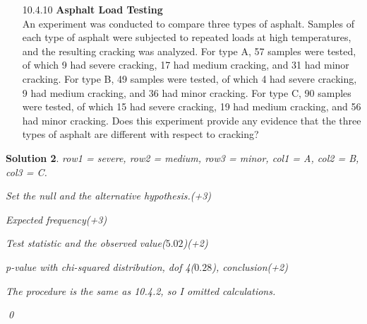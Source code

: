 \documentclass[a4paper,10pt]{article}
\newtheorem*{sol}{Solution}
\begin{document}
\begin{itemize}
\begin{sol}
	Thus
	\[
		\sum_{i, j}\frac{(x_{ij}-e_{ij})^2}{e_{ij}} = \frac{(x_{11}x_{22} - x_{12}x_{21})^2}{n^2}\sum_{i, j}\frac{1}{e_{ij}}.
	\]
	But
	\[
		\frac{1}{e_{ij}} = \frac{n}{x_{i\cdot}x_{\cdot j}} = \frac{n x_{i'\cdot}x_{\cdot j'}}{x_{1\cdot}x_{\cdot 1}x_{2\cdot}x_{\cdot 2}}.
	\]
	Also,
	\[
		\sum_{i, j}x_{i\cdot}x_{\cdot j} = n^2.
	\]
	Combinining the above,
	\[
		X^2 = \frac{(x_{11}x_{22} - x_{12}x_{21})^2}{n^2} \frac{n}{x_{1\cdot}x_{\cdot 1}x_{2\cdot} x_{\cdot 2}} n^2.
	\](+10)

	\qed
\end{sol}

\item [10.4.10]\textbf{Asphalt Load Testing}\\
An experiment was conducted to compare three types of
asphalt. Samples of each type of asphalt were subjected
to repeated loads at high temperatures, and the resulting
cracking was analyzed. For type A, 57 samples were
tested, of which 9 had severe cracking, 17 had medium
cracking, and 31 had minor cracking. For type B, 49 samples were tested, of which 4 had severe cracking,
9 had medium cracking, and 36 had minor cracking. For
type C, 90 samples were tested, of which 15 had severe
cracking, 19 had medium cracking, and 56 had minor
cracking. Does this experiment provide any evidence
that the three types of asphalt are different with respect
to cracking?
\end{itemize}

\begin{sol}
	row1 = severe, row2 = medium, row3 = minor, col1 = A, col2 = B, col3 = C.

	Set the null and the alternative hypothesis.(+3)

	Expected frequency(+3)

	Test statistic and the observed value($5.02$)(+2)

p-value with chi-squared distribution, dof 4($0.28$), conclusion(+2)

	The procedure is the same as 10.4.2, so I omitted calculations.

	\qed
\end{sol}
\end{document}
